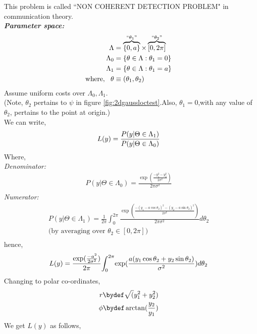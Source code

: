 \documentclass[12pt]{report}
\begin{document}
\begin{exmp}
This problem is called ``NON COHERENT DETECTION PROBLEM" in communication theory.\\
{\bf \em Parameter space:}\\
\begin{align*}
\Lambda &=\overbrace{\{0,a\}}^{``\theta_1"}\times\overbrace{[0,2\pi]}^{``\theta_2"}\\
\Lambda_0 &=\{\theta\in\Lambda : \theta_1=0\}\\
\Lambda_1 &=\{\theta\in\Lambda : \theta_1=a\}\\
\text{where},~~\theta&\equiv(\theta_1,\theta_2)\\
\end{align*}
Assume uniform costs over $\Lambda_0, \Lambda_1.$\\
(Note, $\theta_2$ pertains to $\psi$ in figure \ref{fig:2dgaussloctest}.Also, $\theta_1=0$,with any value of $\theta_2$, pertains to the point at origin.)\\
We can write,
\begin{equation}
L(y) ={\frac{P(y|\Theta \in \Lambda_1)}{P(y|\Theta\in \Lambda_0)}}\\\\
\end{equation}
Where,\\
{\em Denominator:}
\begin{align*}
P(y|\Theta \in \Lambda_0) = {\frac{\exp(\frac{-y^2_1-y^2_2}{2\sigma^2})}{2\pi\sigma^2}}\\
\end{align*}
{\em Numerator:}
\begin{align*}
P(y|\Theta \in \Lambda_1)={\frac{1}{2\pi}}{\int_{0}^{2\pi} \frac{\exp(\frac{-(y_1-a\cos\theta_2 )^2 -(y_2-a\sin\theta_2)^2}{2\sigma^2})}{2\pi\sigma^2}}d\theta_2\\
\text{(by averaging over $\theta_2\in[0,2\pi])$}\\
\end{align*}
hence,
\begin{equation}
L(y)={\frac{\exp(\frac{-a^2}{2\sigma^2})}{2\pi}}{\int_{0}^{2\pi}} {\exp(\frac{a(y_1\cos\theta_2+y_2\sin\theta_2)}{\sigma^2})d\theta_2}\\
\end{equation}
Changing to polar co-ordinates,
\begin{align*}
r \bydef \sqrt(y_1^2+y_2^2)\\
\phi \bydef \arctan(\frac{y_2}{y_1})
\end{align*}
We get $L(y)$ as follows,
\begin{align*}

\end{align*}
\end{exmp}
\end{document}
